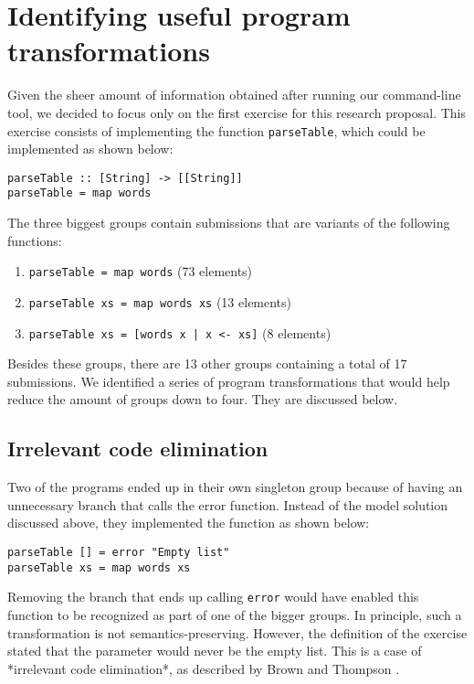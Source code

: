 \section{Identifying useful program transformations}

Given the sheer amount of information obtained after running our command-line tool, we decided to focus only on the first exercise for this research proposal. This exercise consists of implementing the function \texttt{parseTable}, which could be implemented as shown below:

\begin{verbatim}
parseTable :: [String] -> [[String]]
parseTable = map words
\end{verbatim}

The three biggest groups contain submissions that are variants of the following functions:

\begin{enumerate}
\item \texttt{parseTable = map words} (73 elements)
\item \texttt{parseTable xs = map words xs} (13 elements)
\item \texttt{parseTable xs = [words x | x <- xs]} (8 elements)
\end{enumerate}

Besides these groups, there are 13 other groups containing a total of 17 submissions. We identified a series of program transformations that would help reduce the amount of groups down to four. They are discussed below.

\subsection{Irrelevant code elimination}

Two of the programs ended up in their own singleton group because of having an unnecessary branch that calls the error function. Instead of the model solution discussed above, they implemented the function as shown below:

\begin{verbatim}
parseTable [] = error "Empty list"
parseTable xs = map words xs
\end{verbatim}

Removing the branch that ends up calling \texttt{error} would have enabled this function to be recognized as part of one of the bigger groups. In principle, such a transformation is not semantics-preserving. However, the definition of the exercise stated that the parameter would never be the empty list. This is a case of *irrelevant code elimination*, as described by Brown and Thompson \cite{2007brown}.

